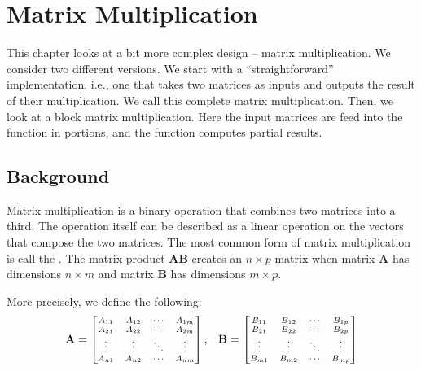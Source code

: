
\chapter{Matrix Multiplication}
\glsresetall
\label{chapter:matrix_multiplication}

This chapter looks at a bit more complex design -- matrix multiplication. We consider two different versions. We start with a ``straightforward'' implementation, i.e., one that takes two matrices as inputs and outputs the result of their multiplication. We call this complete matrix multiplication. Then, we look at a block matrix multiplication. Here the input matrices are feed into the function in portions, and the function computes partial results.

\section{Background}

Matrix multiplication is a binary operation that combines two matrices into a third. The operation itself can be described as a linear operation on the vectors that compose the two matrices. The most common form of matrix multiplication is call the . The matrix product $\mathbf{AB}$ creates an $n \times p$ matrix when matrix $\mathbf{A}$ has dimensions $n \times m$ and matrix $\mathbf{B}$ has dimensions $m \times p$. 

More precisely, we define the following:
\begin{equation}
\scriptsize
\mathbf{A} =
 \begin{bmatrix}
  A_{11} & A_{12}  & \cdots & A_{1m} \\
  A_{21} & A_{22}  & \cdots & A_{2m} \\
  \vdots  & \vdots  &\ddots & \vdots  \\
    A_{n1} & A_{n2}  & \cdots & A_{nm} \\
 \end{bmatrix},  \quad
\mathbf{B} =
 \begin{bmatrix}
  B_{11} & B_{12}  & \cdots & B_{1p} \\
  B_{21} & B_{22}  & \cdots & B_{2p} \\
  \vdots  & \vdots   &\ddots & \vdots  \\
  B_{m1} & B_{m2}  & \cdots & B_{mp} \\
 \end{bmatrix}
\end{equation} 

